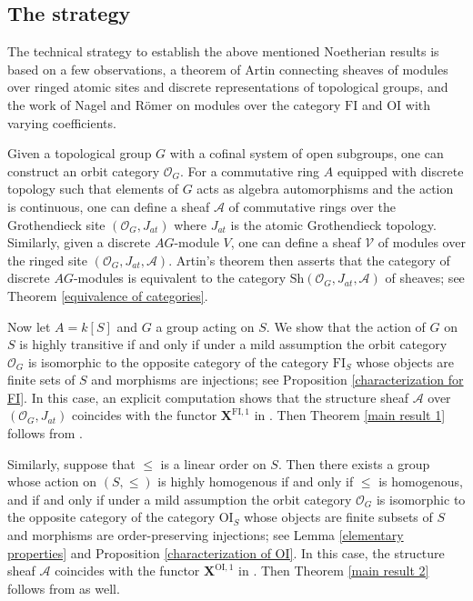 \documentclass[11pt, reqno]{amsart}
\theoremstyle{plain}
\numberwithin{equation}{section}
\theoremstyle{definition}
\newcommand{\OI}{{\mathrm{OI}}}
\newcommand{\FI}{{\mathrm{FI}}}
\newcommand{\Sh}{{\mathrm{Sh}}}
\begin{document}
\subsection{The strategy}

The technical strategy to establish the above mentioned Noetherian results is based on a few observations, a theorem of Artin connecting sheaves of modules over ringed atomic sites and discrete representations of topological groups, and the work of Nagel and R\"{o}mer \cite{NR1} on modules over the category $\FI$ and $\OI$ with varying coefficients.

Given a topological group $G$ with a cofinal system of open subgroups, one can construct an orbit category $\mathcal{O}_G$. For a commutative ring $A$ equipped with discrete topology such that elements of $G$ acts as algebra automorphisms and the action is continuous, one can define a sheaf $\mathcal{A}$ of commutative rings over the Grothendieck site $(\mathcal{O}_G, J_{at})$ where $J_{at}$ is the atomic Grothendieck topology. Similarly, given a discrete $AG$-module $V$, one can define a sheaf $\mathcal{V}$ of modules over the ringed site $(\mathcal{O}_G, J_{at}, \mathcal{A})$. Artin's theorem then asserts that the category of discrete $AG$-modules is equivalent to the category $\Sh(\mathcal{O}_G, J_{at}, \mathcal{A})$ of sheaves; see Theorem \ref{equivalence of categories}.

Now let $A = k[S]$ and $G$ a group acting on $S$. We show that the action of $G$ on $S$ is highly transitive if and only if under a mild assumption the orbit category $\mathcal{O}_G$ is isomorphic to the opposite category of the category $\FI_S$ whose objects are finite sets of $S$ and morphisms are injections; see Proposition \ref{characterization for FI}. In this case, an explicit computation shows that the structure sheaf $\mathcal{A}$ over $(\mathcal{O}_G, J_{at})$ coincides with the functor $\mathbf{X}^{\FI, 1}$ in \cite[Definition 2.17]{NR1}. Then Theorem \ref{main result 1} follows from \cite[Theorem 6.15]{NR1}.

Similarly, suppose that $\leqslant$ is a linear order on $S$. Then there exists a group whose action on $(S, \leqslant)$ is highly homogenous if and only if $\leqslant$ is homogenous, and if and only if under a mild assumption the orbit category $\mathcal{O}_G$ is isomorphic to the opposite category of the category $\OI_S$ whose objects are finite subsets of $S$ and morphisms are order-preserving injections; see Lemma \ref{elementary properties} and Proposition \ref{characterization of OI}. In this case, the structure sheaf $\mathcal{A}$ coincides with the functor $\mathbf{X}^{\OI, 1}$ in \cite[Definition 2.17]{NR1}. Then Theorem \ref{main result 2} follows from \cite[Theorem 6.15]{NR1} as well.
\end{document}
